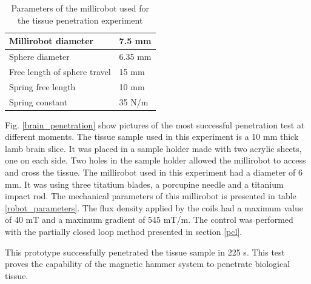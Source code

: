 \documentclass[letterpaper, 10 pt, conference]{ieeeconf}  %
\begin{document}
\begin{table}[]
\centering
\caption{Parameters of the millirobot used for the tissue penetration experiment}
\label{my-label}
\begin{tabular}{|l|l|}
\hline
Millirobot diameter          & 7.5 mm  \\ \hline
Sphere diameter              & 6.35 mm \\ \hline
Free length of sphere travel & 15 mm   \\ \hline
Spring free length           & 10 mm   \\ \hline
Spring constant              & 35 N/m  \\ \hline
\end{tabular}
\end{table}

Fig. \ref{brain_penetration} show pictures of the most successful penetration test at different moments. The tissue sample used in this experiment is a 10 mm thick lamb brain slice. It was placed in a sample holder made with two acrylic sheets, one on each side. Two holes in the sample holder allowed the millirobot to access and cross the tissue. The millirobot used in this experiment had a diameter of 6 mm. It was using three titatium blades, a porcupine needle and a titanium impact rod. The mechanical parameters of this millirobot is presented in table \ref{robot_parameters}. The flux density applied by the coils had a maximum value of 40 mT and a maximum gradient of 545 mT/m. The control was performed with the partially closed loop method presented in section \ref{pcl}.\par
This prototype successfully penetrated the tissue sample in 225 s. This test proves the capability of the magnetic hammer system to penetrate biological tissue.
\end{document}

